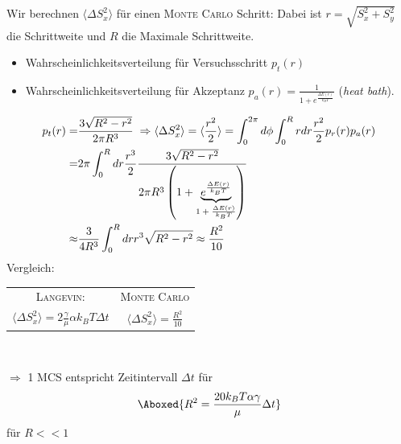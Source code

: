 \documentclass[12pt]{article}
\begin{document}
    Wir berechnen $\langle \Delta S_x^2 \rangle $ für einen \textsc{Monte Carlo} Schritt: Dabei ist $r = \sqrt{S_x^2 + S_y^2}$ die Schrittweite und $R$ die Maximale Schrittweite.
    \begin{itemize}
    \item Wahrscheinlichkeitsverteilung für Versuchsschritt $p_t (r)$
    \item Wahrscheinlichkeitsverteilung für Akzeptanz $p_a (r) = \frac{1}{1 + e^\frac{\Delta E(r)}{k_B T}}$ (\textit{heat bath}).
    \end{itemize}
    \begin{align}
p_t (r) = & \frac{3 \sqrt{ R^2 - r^2}} { 2 \pi R^3}     \; \Rightarrow \langle\Delta S_x^2 \rangle = \langle \frac{r^2}{2} \rangle = \int_0^{2 \pi} d \phi \int_0 ^R r dr \frac{r^2}{2} p_r (r) p_a (r)   \\
=& 2 \pi  \int_0^R dr \frac{r^3}{2} \frac{3 \sqrt{R^2 - r^2}}{2\pi R^3 \left( 1 + \underbrace{ e^\frac{\Delta E (r) }{k_B T}}_\text{$ 1+ \frac{\Delta E (r)}{k_B T}$} \right)} 
\\ \approx & \frac{3}{4 R^3} \int_0^R dr r^3 \sqrt{R^2 - r^2} \approx \frac{R^2}{10}
\end{align}
Vergleich:  \\
\begin{center}


\begin{tabular}{ c c }
\textsc{Langevin:} & \textsc{Monte Carlo} \\ 
$\langle \Delta S_x^2 \rangle = 2\frac{\gamma}{\mu} \alpha k_B T \Delta t $ & $ \langle \Delta S_x^2 \rangle = \frac{R^2}{10} $\\ 
\end{tabular} \\
\end{center}

$\Rightarrow $ 1 MCS entspricht Zeitintervall $\Delta t$ für
\begin{align}
\Aboxed{ R^2 = \frac{20 k_B T \alpha \gamma}{\mu} \Delta t }
\end{align}
für $R<<1$
 
\end{document}
